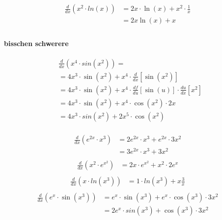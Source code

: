 \documentclass{report}
\begin{document}
\begin{multicols}{2}
\begin{align*}
\frac{d}{dx} (x^2 \cdot  ln(x)) &=2x \cdot \ln(x) + x^2 \cdot \frac{1}{x}\\
&=2x \ln(x) + x\\
\end{align*}
\paragraph{bisschen schwerere} %
\label{par:bisschen schwerere}

\begin{align*}
&\frac{d}{dx} (x^4 \cdot sin(x^2)) =\\
&=4x^3\cdot\sin(x^2)+x^4 \cdot \frac{d}{dx}\left[\sin(x^2)\right] \\
&=4x^3\cdot\sin(x^2)+x^4 \cdot \frac{df}{du}\left[\sin(u)\right] \cdot \frac{du}{dx}\left[x^2\right] \\
&=4x^3\cdot\sin(x^2)+x^4 \cdot \cos(x^2)\cdot 2x\\
&=4x^3 \cdot sin(x^2)+2x^5 \cdot \cos(x^2)\\
\end{align*}

\begin{align*}
\frac{d}{dx} (e^{2x} \cdot x^3) &=2e^{2x} \cdot x^3 + e^{2x} \cdot 3x^2 \\
                                &=3e^{2x} \cdot x^3 + 3x^2\\
\end{align*}
\begin{align*}
\frac{d}{dx} (x^2 \cdot  e^{x^2}) &=2x \cdot e^{x^2} + x^2 \cdot 2e^x\\
\end{align*}
\begin{align*}
\frac{d}{dx} (x \cdot  ln(x^3)) &=1 \cdot ln(x^3) + x \frac{3}{x}\\
\end{align*}
\begin{align*}
\frac{d}{dx} (e^x \cdot  \sin(x^3)) &=e^x \cdot \sin(x^3) + e^x \cdot \cos(x^3) \cdot 3x^2 \\
&=2e^x \cdot sin(x^3) + \cos(x^3) \cdot 3x^2\\
\end{align*}
\end{multicols}
\end{document}
